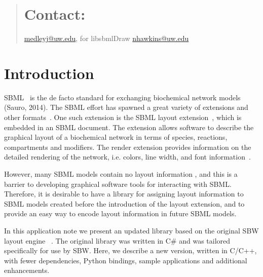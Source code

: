 \documentclass{bioinfo}
\begin{document}
\begin{abstract}
\section{Contact:}\href{medleyj@uw.edu}{medleyj@uw.edu}, for libsbmlDraw \href{nhawkins@uw.edu}{nhawkins@uw.edu}
\end{abstract} 

\section{Introduction}


SBML~\citep{Hucka:2003fs} is the de facto standard for exchanging biochemical network models (Sauro, 2014). The SBML effort has spawned a great variety of extensions and other formats~\citep{Drager2014}. One such extension is the SBML layout extension~\citep{Gauges2006}, which is embedded in an SBML document. The extension allows software to describe the graphical layout of a biochemical network in terms of species, reactions, compartments and modifiers. The render extension provides information on the detailed rendering of the network, i.e. colors, line width, and font information~\citep{Gauges2009}. 

However, many SBML models contain no layout information \citep{BergmanSBW2006}, and this is a barrier to developing graphical software tools for interacting with SBML. Therefore, it is desirable to have a library for assigning layout information to SBML models created before the introduction of the layout extension, and to provide an easy way to encode layout information in future SBML models. 

In this application note we present an updated library based on the original SBW layout engine ~\citep{Deckard2006}. The original library was written in C\# and was tailored specifically for use by SBW.
Here, we describe a new version, written in C/C++, with fewer dependencies,
Python bindings, sample applications and additional enhancements. 
\end{document}
